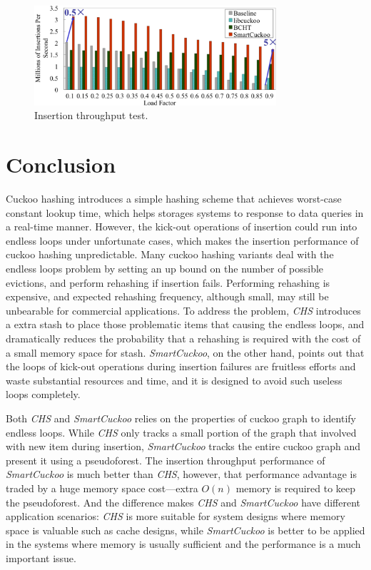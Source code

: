 \documentclass[runningheads]{llncs}
\begin{document}
\begin{figure}
    \centering
    \includegraphics[width=0.8\textwidth]{performance.png}
    \caption{Insertion throughput test.} \label{fig:performance}
\end{figure}

\section{Conclusion}
\label{sec:conclude}
Cuckoo hashing introduces a simple hashing scheme that achieves worst-case constant lookup time, which helps storages systems to response to data queries in a real-time manner. However, the kick-out operations of insertion could run into endless loops under unfortunate cases, which makes the insertion performance of cuckoo hashing unpredictable. Many cuckoo hashing variants deal with the endless loops problem by setting an up bound on the number of possible evictions, and perform rehashing if insertion fails. Performing rehashing is expensive, and expected rehashing frequency, although small, may still be unbearable for commercial applications. To address the problem, \textit{CHS} introduces a extra stash to place those problematic items that causing the endless loops, and dramatically reduces the probability that a rehashing is required with the cost of a small memory space for stash. \textit{SmartCuckoo}, on the other hand, points out that the loops of kick-out operations during insertion failures are fruitless efforts and waste substantial resources and time, and it is designed to avoid such useless loops completely.

Both \textit{CHS} and \textit{SmartCuckoo} relies on the properties of cuckoo graph to identify endless loops. While \textit{CHS} only tracks a small portion of the graph that involved with new item during insertion, \textit{SmartCuckoo} tracks the entire cuckoo graph and present it using a pseudoforest. The insertion throughput performance of \textit{SmartCuckoo} is much better than \textit{CHS}, however, that performance advantage is traded by a huge memory space cost---extra $O(n)$ memory is required to keep the pseudoforest. And the difference makes \textit{CHS} and \textit{SmartCuckoo} have different application scenarios: \textit{CHS} is more suitable for system designs where memory space is valuable such as cache designs, while \textit{SmartCuckoo} is better to be applied in the systems where memory is usually sufficient and the performance is a much important issue.
\end{document}
